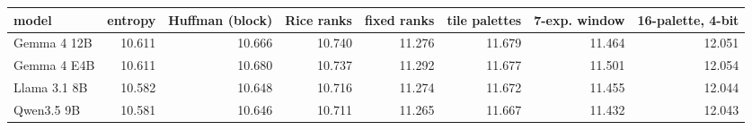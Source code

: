 \begin{tabular}{lrrrrrrr}
\toprule
model & entropy & Huffman (block) & Rice ranks & fixed ranks & tile palettes & 7-exp. window & 16-palette, 4-bit \\
\midrule
Gemma 4 12B & 10.611 & 10.666 & 10.740 & 11.276 & 11.679 & 11.464 & 12.051 \\
Gemma 4 E4B & 10.611 & 10.680 & 10.737 & 11.292 & 11.677 & 11.501 & 12.054 \\
Llama 3.1 8B & 10.582 & 10.648 & 10.716 & 11.274 & 11.672 & 11.455 & 12.044 \\
Qwen3.5 9B & 10.581 & 10.646 & 10.711 & 11.265 & 11.667 & 11.432 & 12.043 \\
\bottomrule
\end{tabular}
